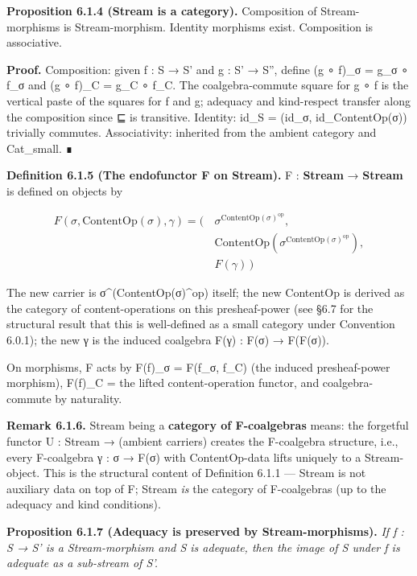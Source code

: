 \documentclass[11pt, openany]{book}
\begin{document}
\textbf{Proposition 6.1.4 (Stream is a category).} Composition of Stream-morphisms is Stream-morphism. Identity morphisms exist. Composition is associative.

\textbf{Proof.} Composition: given f : S → S' and g : S' → S'', define (g ∘ f)\_\allowbreak{}σ = g\_\allowbreak{}σ ∘ f\_\allowbreak{}σ and (g ∘ f)\_\allowbreak{}C = g\_\allowbreak{}C ∘ f\_\allowbreak{}C. The coalgebra-commute square for g ∘ f is the vertical paste of the squares for f and g; adequacy and kind-respect transfer along the composition since ⊑ is transitive. Identity: id\_\allowbreak{}S = (id\_\allowbreak{}σ, id\_\allowbreak{}ContentOp(σ)) trivially commutes. Associativity: inherited from the ambient category and Cat\_\allowbreak{}small. ∎

\textbf{Definition 6.1.5 (The endofunctor F on Stream).} F : \textbf{Stream} → \textbf{Stream} is defined on objects by

\[
\begin{aligned}
F(\sigma, \mathrm{ContentOp}(\sigma), \gamma) = \bigl(\, & \sigma^{\mathrm{ContentOp}(\sigma)^{\mathrm{op}}}, \\
& \mathrm{ContentOp}(\sigma^{\mathrm{ContentOp}(\sigma)^{\mathrm{op}}}), \\
& F(\gamma)\,\bigr)
\end{aligned}
\]

The new carrier is σ\textasciicircum{}(ContentOp(σ)\textasciicircum{}op) itself; the new ContentOp is derived as the category of content-operations on this presheaf-power (see §6.7 for the structural result that this is well-defined as a small category under Convention 6.0.1); the new γ is the induced coalgebra F(γ) : F(σ) → F(F(σ)).

On morphisms, F acts by F(f)\_\allowbreak{}σ = F(f\_\allowbreak{}σ, f\_\allowbreak{}C) (the induced presheaf-power morphism), F(f)\_\allowbreak{}C = the lifted content-operation functor, and coalgebra-commute by naturality.

\textbf{Remark 6.1.6.} Stream being a \textbf{category of F-coalgebras} means: the forgetful functor U : Stream → (ambient carriers) creates the F-coalgebra structure, i.e., every F-coalgebra γ : σ → F(σ) with ContentOp-data lifts uniquely to a Stream-object. This is the structural content of Definition 6.1.1 --- Stream is not auxiliary data on top of F; Stream \textit{is} the category of F-coalgebras (up to the adequacy and kind conditions).

\textbf{Proposition 6.1.7 (Adequacy is preserved by Stream-morphisms).} \textit{If f : S → S' is a Stream-morphism and S is adequate, then the image of S under f is adequate as a sub-stream of S'.}
\end{document}
